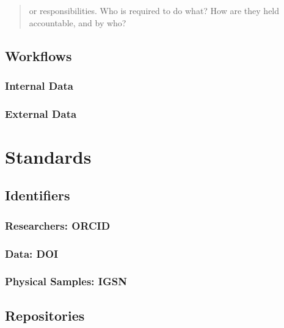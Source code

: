 \documentclass[
]{book}
\begin{document}
\begin{quote}
or responsibilities. Who is required to do what? How are they held accountable, and by who?
\end{quote}

\hypertarget{workflows}{%
\section{Workflows}\label{workflows}}

\hypertarget{internal-data}{%
\subsection{Internal Data}\label{internal-data}}

\hypertarget{external-data}{%
\subsection{External Data}\label{external-data}}

\hypertarget{standards}{%
\chapter{Standards}\label{standards}}

\hypertarget{identifiers}{%
\section{Identifiers}\label{identifiers}}

\hypertarget{researchers-orcid}{%
\subsection{Researchers: ORCID}\label{researchers-orcid}}

\hypertarget{data-doi}{%
\subsection{Data: DOI}\label{data-doi}}

\hypertarget{physical-samples-igsn}{%
\subsection{Physical Samples: IGSN}\label{physical-samples-igsn}}

\hypertarget{repositories}{%
\section{Repositories}\label{repositories}}
\end{document}
